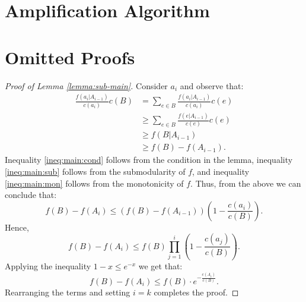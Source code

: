 \documentclass[a4paper,UKenglish,cleveref, autoref]{lipics-v2019}
\begin{document}
\section{Amplification Algorithm}\label{sec:Amplification}
 




\appendix
\section{Omitted Proofs}
\label{appendix:omitted}
\begin{proof}[Proof of Lemma \ref{lemma:sub-main}]
	

		Consider $a_i$ and observe that:
		\begin{align}
		\frac{f(a_i|A_{i-1})}{c(a_i)}c(B)
		& = \sum_{e \in B} \frac{f(a_i|A_{i-1})}{c(a_i)}c(e)
		\nonumber
		\\ 	& \geq \sum_{e \in B} \frac{f(e|A_{i-1})}{c(e)}c(e)
		\label{ineq:main:cond}
		\\	& \geq f(B|A_{i-1})
		\label{ineq:main:sub}
		\\ 	& \geq f(B) - f(A_{i-1}).
		\label{ineq:main:mon}
		\end{align}
		Inequality \eqref{ineq:main:cond} follows from the condition in the lemma, inequality \eqref{ineq:main:sub} follows from the submodularity of $f$, and inequality \eqref{ineq:main:mon} follows from the monotonicity of $f$.
		Thus, from the above we can conclude that:
		$$
		f(B) - f(A_i)  \leq (f(B) - f(A_{i - 1}))
		\left(1 - \frac{c(a_i)}{c(B)}\right).
		$$
		Hence,
		$$
		f(B) - f(A_i)  \leq f(B) \prod_{j = 1}^{i}
		\left(1 - \frac{c(a_j)}{c(B)}\right).
		$$
		Applying the inequality $1 - x \leq e^{-x}$ we get that:
		$$
		f(B) - f(A_i)  \leq f(B)\cdot
		e^{-\frac{c(A_i)}{c(B)}}.
		$$
		Rearranging the terms and setting $i = k$ completes the proof.

	
	
	
\end{proof}
\end{document}
